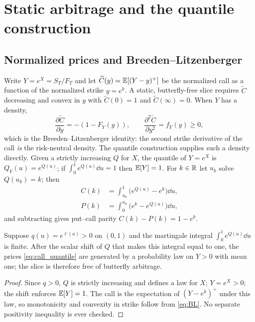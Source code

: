 \documentclass[11pt]{article}
\begin{document}
\section{Static arbitrage and the quantile construction}
\label{sec:static}

\subsection{Normalized prices and Breeden--Litzenberger}

Write $Y=e^X=S_T/F_T$ and let $\widetilde C(y)=\mathbb{E}[(Y-y)^+]$ be the normalized
call as a function of the normalized strike $y=e^k$. A static, butterfly-free
slice requires $\widetilde C$ decreasing and convex in $y$ with
$\widetilde C(0)=1$ and $\widetilde C(\infty)=0$. When $Y$ has a density,
\begin{equation}
\frac{\partial\widetilde C}{\partial y}=-(1-F_Y(y)),
\qquad
\frac{\partial^2\widetilde C}{\partial y^2}=f_Y(y)\ge 0,
\label{eq:BL}
\end{equation}
which is the Breeden--Litzenberger identity: the second strike derivative of the
call \emph{is} the risk-neutral density. The quantile construction supplies such
a density directly. Given a strictly increasing $Q$ for $X$, the quantile of
$Y=e^X$ is $Q_Y(u)=e^{Q(u)}$; if $\int_0^1 e^{Q(u)}\dd u=1$ then $\mathbb{E}[Y]=1$. For
$k\in\mathbb{R}$ let $u_k$ solve $Q(u_k)=k$; then
\begin{align}
C(k)&=\int_{u_k}^1\!\big(e^{Q(u)}-e^{k}\big)\dd u,
\label{eq:call_quantile}\\
P(k)&=\int_0^{u_k}\!\big(e^{k}-e^{Q(u)}\big)\dd u,
\end{align}
and subtracting gives put--call parity $C(k)-P(k)=1-e^k$.

\begin{proposition}
\label{prop:nobutterfly}
Suppose $q(u)=e^{\ell(u)}>0$ on $(0,1)$ and the martingale integral
$\int_0^1 e^{Q(u)}\dd u$ is finite. After the scalar shift of $Q$ that makes this
integral equal to one, the prices \eqref{eq:call_quantile} are generated by a
probability law on $Y>0$ with mean one; the slice is therefore free of butterfly
arbitrage.
\end{proposition}

\begin{proof}
Since $q>0$, $Q$ is strictly increasing and defines a law for $X$; $Y=e^X>0$;
the shift enforces $\mathbb{E}[Y]=1$. The call is the expectation of $(Y-e^k)^+$ under
this law, so monotonicity and convexity in strike follow from \eqref{eq:BL}. No
separate positivity inequality is ever checked.
\end{proof}
\end{document}
